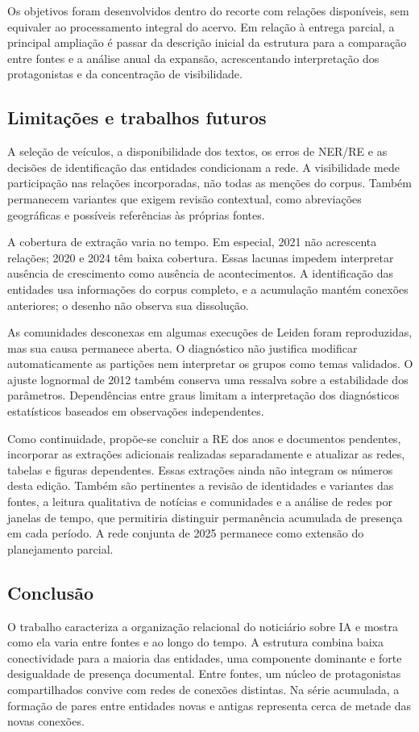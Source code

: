 \documentclass[11pt,a4paper]{article}
\begin{document}
Os objetivos foram desenvolvidos dentro do recorte com relações disponíveis, sem equivaler ao processamento integral do acervo. Em relação à entrega parcial, a principal ampliação é passar da descrição inicial da estrutura para a comparação entre fontes e a análise anual da expansão, acrescentando interpretação dos protagonistas e da concentração de visibilidade.

\subsection{Limitações e trabalhos futuros}
A seleção de veículos, a disponibilidade dos textos, os erros de NER/RE e as decisões de identificação das entidades condicionam a rede. A visibilidade mede participação nas relações incorporadas, não todas as menções do corpus. Também permanecem variantes que exigem revisão contextual, como abreviações geográficas e possíveis referências às próprias fontes.

A cobertura de extração varia no tempo. Em especial, 2021 não acrescenta relações; 2020 e 2024 têm baixa cobertura. Essas lacunas impedem interpretar ausência de crescimento como ausência de acontecimentos. A identificação das entidades usa informações do corpus completo, e a acumulação mantém conexões anteriores; o desenho não observa sua dissolução.

\clearpage
As comunidades desconexas em algumas execuções de Leiden foram reproduzidas, mas sua causa permanece aberta. O diagnóstico não justifica modificar automaticamente as partições nem interpretar os grupos como temas validados. O ajuste lognormal de 2012 também conserva uma ressalva sobre a estabilidade dos parâmetros. Dependências entre graus limitam a interpretação dos diagnósticos estatísticos baseados em observações independentes.

Como continuidade, propõe-se concluir a RE dos anos e documentos pendentes, incorporar as extrações adicionais realizadas separadamente e atualizar as redes, tabelas e figuras dependentes. Essas extrações ainda não integram os números desta edição. Também são pertinentes a revisão de identidades e variantes das fontes, a leitura qualitativa de notícias e comunidades e a análise de redes por janelas de tempo, que permitiria distinguir permanência acumulada de presença em cada período. A rede conjunta de 2025 permanece como extensão do planejamento parcial.

\subsection{Conclusão}
O trabalho caracteriza a organização relacional do noticiário sobre IA e mostra como ela varia entre fontes e ao longo do tempo. A estrutura combina baixa conectividade para a maioria das entidades, uma componente dominante e forte desigualdade de presença documental. Entre fontes, um núcleo de protagonistas compartilhados convive com redes de conexões distintas. Na série acumulada, a formação de pares entre entidades novas e antigas representa cerca de metade das novas conexões.
\end{document}
